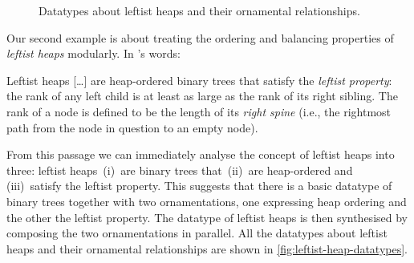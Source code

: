 \begin{figure}
\begin{center}
\end{center}
\caption{Datatypes about leftist heaps and their ornamental relationships.}
\label{fig:leftist-heap-datatypes}
\end{figure}

Our second example is about treating the ordering and balancing properties of \emph{leftist heaps} modularly.
In \citeauthor{Okasaki-data-structures}'s words:
\begin{quoting}\relax
Leftist heaps [\ldots$\!$] are heap-ordered binary trees that satisfy the \emph{leftist property}: the rank of any left child is at least as large as the rank of its right sibling. The rank of a node is defined to be the length of its \emph{right spine} (i.e., the rightmost path from the node in question to an empty node).
\end{quoting}
From this passage we can immediately analyse the concept of leftist heaps into three: leftist heaps \,(i)~are binary trees that \,(ii)~are heap-ordered and \,(iii)~satisfy the leftist property.
This suggests that there is a basic datatype of binary trees together with two ornamentations, one expressing heap ordering and the other the leftist property.
The datatype of leftist heaps is then synthesised by composing the two ornamentations in parallel.
All the datatypes about leftist heaps and their ornamental relationships are shown in \autoref{fig:leftist-heap-datatypes}.

